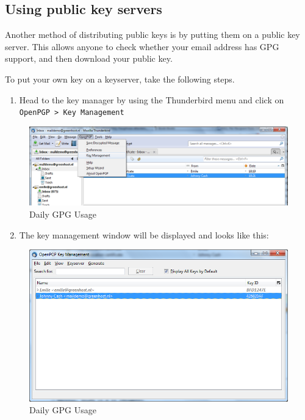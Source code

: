 \subsection{Using public key servers}

Another method of distributing public keys is by putting them on a
public key server. This allows anyone to check whether your email
address has GPG support, and then download your public key.

To put your own key on a keyserver, take the following steps.

\begin{enumerate}[1.]
\item
  Head to the key manager by using the Thunderbird menu and click on
  \verb!OpenPGP > Key Management!
\end{enumerate}
\begin{figure}[htbp]
\centering
\includegraphics{daily_gpg_11.png}
\caption{Daily GPG Usage}
\end{figure}

\begin{enumerate}[1.]
\setcounter{enumi}{1}
\item
  The key management window will be displayed and looks like this:
\end{enumerate}
\begin{figure}[htbp]
\centering
\includegraphics{daily_gpg_12.png}
\caption{Daily GPG Usage}
\end{figure}

